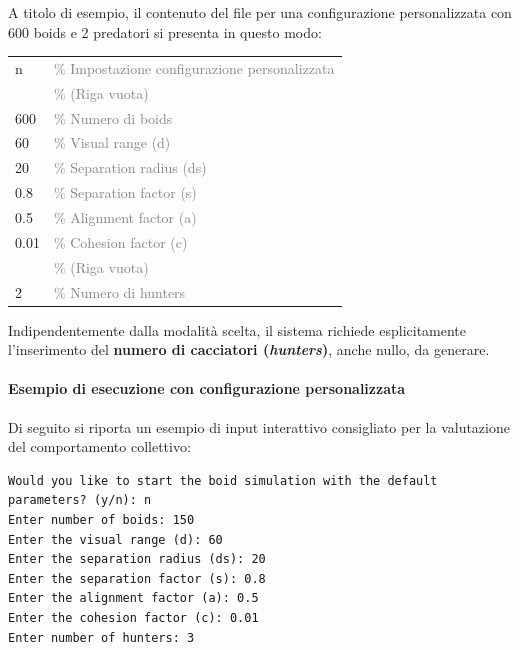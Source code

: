 \documentclass[11pt, a4paper]{article}
\begin{document}
A titolo di esempio, il contenuto del file per una configurazione personalizzata con 600 boids e 2 predatori si presenta in questo modo:
\begin{tcolorbox}[
  colback=gray!5!white,
  colframe=gray!75!black,
  title=Esempio di \texttt{configuration.txt} commentato,
  arc=1mm
]
\small\ttfamily
\begin{tabular}{ll}
n       & \textcolor{gray}{\% Impostazione configurazione personalizzata} \\
        & \textcolor{gray}{\% (Riga vuota)} \\
600     & \textcolor{gray}{\% Numero di boids} \\
60      & \textcolor{gray}{\% Visual range (d)} \\
20      & \textcolor{gray}{\% Separation radius (ds)} \\
0.8     & \textcolor{gray}{\% Separation factor (s)} \\
0.5     & \textcolor{gray}{\% Alignment factor (a)} \\
0.01    & \textcolor{gray}{\% Cohesion factor (c)} \\
        & \textcolor{gray}{\% (Riga vuota)} \\
2       & \textcolor{gray}{\% Numero di hunters}
\end{tabular}
\end{tcolorbox}
Indipendentemente dalla modalità scelta, il sistema richiede esplicitamente l'inserimento del \textbf{numero di cacciatori (\textit{hunters})}, anche nullo, da generare.
\paragraph{Esempio di esecuzione con configurazione personalizzata}
Di seguito si riporta un esempio di input interattivo consigliato per la valutazione del comportamento collettivo:
\begin{lstlisting}
Would you like to start the boid simulation with the default parameters? (y/n): n
Enter number of boids: 150
Enter the visual range (d): 60
Enter the separation radius (ds): 20
Enter the separation factor (s): 0.8
Enter the alignment factor (a): 0.5
Enter the cohesion factor (c): 0.01
Enter number of hunters: 3
\end{lstlisting}
\end{document}
